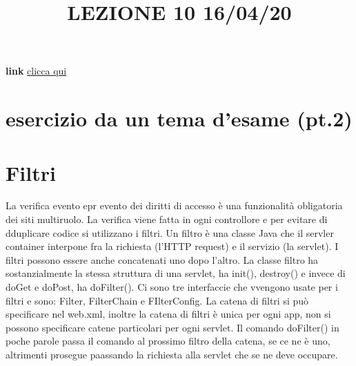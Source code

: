 \title{LEZIONE 10 16/04/20}
\textbf{link} \href{https://web.microsoftstream.com/video/23680e25-5ca6-48fc-aeb4-4cdbbee98726?list=user&userId=cfe0965d-9a7c-40e2-be6e-f078296a1914}{clicca qui}
\section{esercizio da un tema d'esame (pt.2)}
\section{Filtri}
La verifica evento epr evento dei diritti di accesso è una funzionalità obligatoria dei siti multiruolo.\newline
La verifica viene fatta in ogni controllore e per evitare di dduplicare codice si utilizzano i filtri.\newline
Un filtro è una classe Java che il servler container interpone fra la richiesta (l'HTTP request) e il servizio (la servlet). I filtri possono essere anche concatenati uno dopo l'altro.\newline
\newline
La classe filtro ha sostanzialmente la stessa struttura di una servlet, ha init(), destroy() e invece di doGet e doPost, ha doFilter(). Ci sono tre interfaccie che vvengono usate per i filtri e sono: Filter, FilterChain e FIlterConfig.\newline
\newline
La catena di filtri si può specificare nel web.xml, inoltre la catena di filtri è unica per ogni app, non si possono specificare catene particolari per ogni servlet. Il comando doFilter() in poche parole passa il comando al prossimo filtro della catena, se ce ne è uno, altrimenti prosegue paassando la richiesta alla servlet che se ne deve occupare.\newline
\newline

